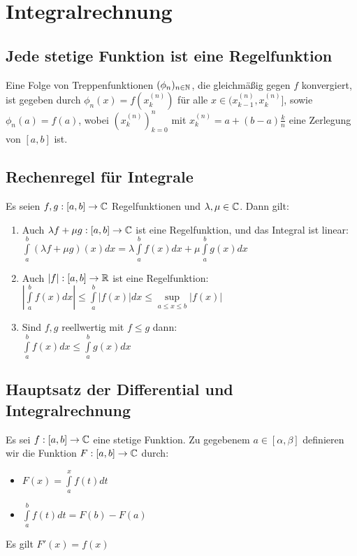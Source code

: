 \documentclass[german]{latex4ei/latex4ei_sheet}
\begin{document}
\section{Integralrechnung}

\begin{sectionbox}
	\subsection{Jede stetige Funktion ist eine Regelfunktion }
	Eine Folge von Treppenfunktionen $(\phi_n)_{n \in \operatorname{\mathbb N}}$, die gleichmäßig gegen $f$ konvergiert, ist gegeben durch
	$\phi_n(x) = f(x_k^{(n)})$  für alle $x \in (x_{k-1}^{(n)} ,x_k^{(n)}]$, sowie $\phi_n(a) = f(a)$, wobei $(x_k^{(n)})_{k=0}^{n}$  mit $x_k^{(n)}=a+(b-a) \frac{k}{n}$ eine Zerlegung von $[a,b]$ ist. 
\end{sectionbox}

\begin{sectionbox}
	\subsection{Rechenregel für Integrale}
	Es seien $f, g : [a, b] \rightarrow \mathbb C$ Regelfunktionen und $\lambda, \mu \in \mathbb C$. Dann gilt:
	\begin{enumerate}
		\item Auch $\lambda f + \mu g : [a, b] \rightarrow \mathbb C$ ist eine Regelfunktion, und das Integral ist linear:\\ $\int \limits_a^b (\lambda f +\mu g)(x)dx= \lambda \int \limits_a^b f(x) dx + \mu \int \limits_a^b g(x)dx$
		\item Auch $|f| : [a, b] \rightarrow \operatorname{\mathbb R}$ ist eine Regelfunktion:\\
		  	$|\int \limits_a^b f(x)dx | \le \int \limits_a^b |f(x)|dx \le \sup\limits_{a \le x \le b}|f(x)|$
		\item Sind $f, g$ reellwertig mit $f \le g$ dann:\\ $\int \limits_a^b f(x)dx \le \int \limits_a^b g(x)dx$
	\end{enumerate}
\end{sectionbox}
\begin{sectionbox}
	\subsection{Hauptsatz der Differential und Integralrechnung}
	
	Es sei $f : [a,b] \rightarrow \mathbb C$ eine stetige Funktion. Zu gegebenem $a \in [\alpha, \beta]$ definieren wir die Funktion $F : [a, b] \rightarrow \mathbb C$ durch: 
	\begin{itemize}
		\item $F(x)= \int \limits_a^x f(t)dt $
		\item $\int \limits_a^b f(t)dt = F(b)-F(a)$
	\end{itemize}
	Es gilt $F'(x)=f(x)$
	

\end{sectionbox}
\end{document}
